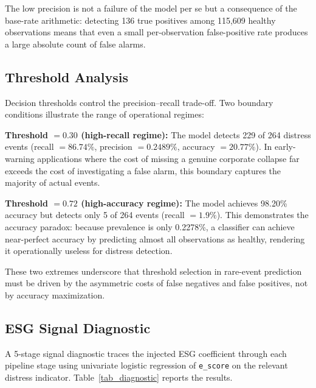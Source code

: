 \documentclass[sigconf,anonymous]{acmart}
\begin{document}
The low precision is not a failure of the model per se but a consequence of the base-rate arithmetic: detecting 136 true positives among 115,609 healthy observations means that even a small per-observation false-positive rate produces a large absolute count of false alarms.

\subsection{Threshold Analysis}
Decision thresholds control the precision--recall trade-off. Two boundary conditions illustrate the range of operational regimes:

\textbf{Threshold $= 0.30$ (high-recall regime):} The model detects 229 of 264 distress events (recall $= 86.74\%$, precision $= 0.2489\%$, accuracy $= 20.77\%$). In early-warning applications where the cost of missing a genuine corporate collapse far exceeds the cost of investigating a false alarm, this boundary captures the majority of actual events.

\textbf{Threshold $= 0.72$ (high-accuracy regime):} The model achieves 98.20\% accuracy but detects only 5 of 264 events (recall $= 1.9\%$). This demonstrates the accuracy paradox: because prevalence is only 0.2278\%, a classifier can achieve near-perfect accuracy by predicting almost all observations as healthy, rendering it operationally useless for distress detection.

These two extremes underscore that threshold selection in rare-event prediction must be driven by the asymmetric costs of false negatives and false positives, not by accuracy maximization.

\subsection{ESG Signal Diagnostic}
\label{sec:signal_diag}
A 5-stage signal diagnostic traces the injected ESG coefficient through each pipeline stage using univariate logistic regression of \texttt{e\_score} on the relevant distress indicator. Table~\ref{tab_diagnostic} reports the results.
\end{document}
